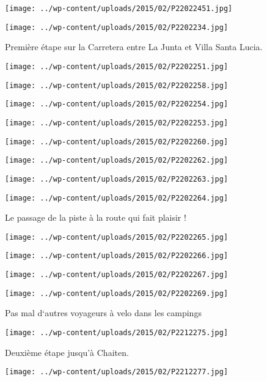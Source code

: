 \centerline{\texttt{[image: ../wp-content/uploads/2015/02/P22022451.jpg]} } 
 \newline
\centerline{\texttt{[image: ../wp-content/uploads/2015/02/P2202234.jpg]} } 
Première étape sur la Carretera entre La Junta et Villa Santa Lucia. \newline
 \newline
\centerline{\texttt{[image: ../wp-content/uploads/2015/02/P2202251.jpg]} } 
\newline
\centerline{\texttt{[image: ../wp-content/uploads/2015/02/P2202258.jpg]} } 
\newline
\centerline{\texttt{[image: ../wp-content/uploads/2015/02/P2202254.jpg]} } 
 \newline
\centerline{\texttt{[image: ../wp-content/uploads/2015/02/P2202253.jpg]} } 
 \newline
\centerline{\texttt{[image: ../wp-content/uploads/2015/02/P2202260.jpg]} } 
 \newline
\centerline{\texttt{[image: ../wp-content/uploads/2015/02/P2202262.jpg]} } 
 \newline
\centerline{\texttt{[image: ../wp-content/uploads/2015/02/P2202263.jpg]} } 
 \newline
\centerline{\texttt{[image: ../wp-content/uploads/2015/02/P2202264.jpg]} } 
Le passage de la piste à la route qui fait plaisir ! \newline
 \newline
\centerline{\texttt{[image: ../wp-content/uploads/2015/02/P2202265.jpg]} } 
\newline
\centerline{\texttt{[image: ../wp-content/uploads/2015/02/P2202266.jpg]} } 
 \newline
\centerline{\texttt{[image: ../wp-content/uploads/2015/02/P2202267.jpg]} } 
 \newline
\centerline{\texttt{[image: ../wp-content/uploads/2015/02/P2202269.jpg]} } 
Pas mal d`autres voyageurs à velo dans les campings \newline
 \newline
\centerline{\texttt{[image: ../wp-content/uploads/2015/02/P2212275.jpg]} } 
Deuxième étape jusqu'à Chaiten. \newline
 \newline
\centerline{\texttt{[image: ../wp-content/uploads/2015/02/P2212277.jpg]} } 
 \newline
